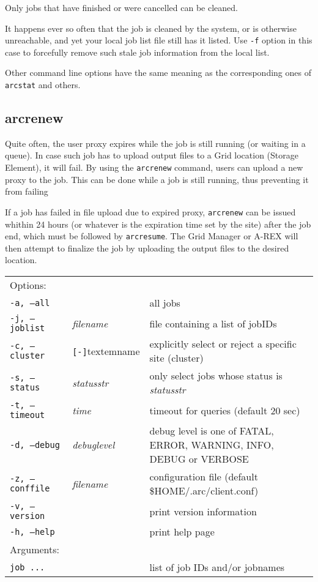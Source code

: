 Only jobs that have finished or were cancelled can be cleaned.

It happens ever so often that the job is cleaned by the system, or is otherwise unreachable, and yet your 
local job list file still has it listed. Use \verb#-f# option in this case to forcefully remove such stale job
information from the local list. 

Other command line options have the same meaning as the corresponding ones of \verb#arcstat# and others.


\subsection{arcrenew}
\label{sec:arcrenew}

Quite often, the user proxy expires while the job is still running (or
waiting in a queue). In case such job has to upload output files to a
Grid location (Storage Element), it will fail. By using the \texttt{arcrenew}
 command, users can upload
a new proxy to the job. This can be done while a job is still running,
thus preventing it from failing

If a job has failed in file upload due to expired proxy, \texttt{arcrenew}
can be issued whithin 24 hours (or whatever is
the expiration time set by the site) after the job
end, which must be followed by \texttt{arcresume}. The Grid
Manager or A-REX will then attempt to finalize
the job by uploading the output files to the desired location. 

\hspace*{0.5cm}
\begin{shaded}
\end{shaded}
\begin{longtable}{llp{8cm}}
   Options:&&\\
   \texttt{-a, --all}& & all jobs\\
   \texttt{-j, --joblist}& \textit{filename} & file containing a list of jobIDs\\
   \texttt{-c, --cluster}&\verb#[-]#textem{name}&explicitly select or reject a specific site (cluster)\\
   \texttt{-s, --status}& \textit{statusstr} &only select jobs whose status is \textit{statusstr}\\
   \texttt{-t, --timeout}& \textit{time} & timeout for queries (default 20 sec)\\
   \texttt{-d, --debug}& \textit{debuglevel}&debug level is one of  FATAL, ERROR, WARNING, INFO, DEBUG or VERBOSE\\
   \texttt{-z, --conffile}&\textit{filename}& configuration file (default {\$}HOME/.arc/client.conf)\\
   \texttt{-v, --version}& & print version information\\
   \texttt{-h, --help}& & print help page\\
   Arguments:&&\\
   \texttt{job ...} && list of job IDs and/or jobnames\\
\end{longtable}

